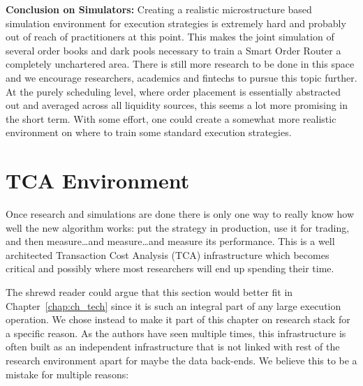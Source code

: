 \noindent\textbf{Conclusion on Simulators:} Creating a realistic microstructure based simulation environment for execution strategies is extremely hard and probably out of reach of practitioners at this point. This makes the joint simulation of several order books and dark pools necessary to train a Smart Order Router a completely unchartered area. There is still more research to be done in this space and we encourage researchers, academics and fintechs to pursue this topic further. At the purely scheduling level, where order placement is essentially abstracted out and averaged across all liquidity sources, this seems a lot more promising in the short term. With some effort, one could create a somewhat more realistic environment on where to train some standard execution strategies.



\section{TCA Environment\label{sec:tca_envir}}\label{in:tca_environ}

Once research and simulations are done there is only one way to really know how well the new algorithm works: put the strategy in production, use it for trading, and then measure\dots and measure\dots and measure its performance. This is a well architected Transaction Cost Analysis (TCA) infrastructure which becomes critical and possibly where most researchers will end up spending their time. 


The shrewd reader could argue that this section would better fit in Chapter~\ref{chap:ch_tech} since it is such an integral part of any large execution operation. We chose instead to make it part of this chapter on research stack for a specific reason. As the authors have seen multiple times, this infrastructure is often built as an independent infrastructure that is not linked with rest of the research environment apart for maybe the data back-ends. We believe this to be a mistake for multiple reasons:

